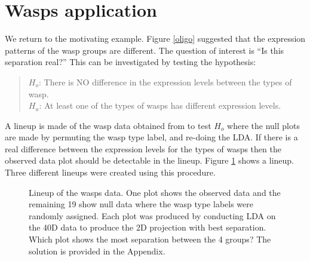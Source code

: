 \section{Wasps application} \label{sec:wasp}

We return to the motivating example. Figure \ref{oligo} suggested that the expression patterns of the wasp groups are different.  The question of interest is ``Is this separation real?'' This can be investigated by testing the hypothesis: 

\begin{quote}
$H_o$: There is NO difference in the expression levels between the types of wasp.\\
$H_a$: At least one of the types of wasps has different expression levels.
\end{quote}
A lineup is made of the wasp data obtained from \cite{toth:2010} to test $H_o$ where the null plots are made by permuting the wasp type label, and re-doing the LDA. If there is a real difference between the expression levels for the types of wasps then the observed data plot should be detectable in the lineup. Figure \ref{toth_lineup} shows a lineup.  Three different lineups were created using this procedure. 

\begin{figure}[hbtp]
   \centering
       \caption{Lineup of the wasps data. One plot shows the observed data and the remaining 19 show null data where the wasp type labels were randomly assigned. Each plot was produced by conducting LDA on the 40D data to produce the 2D projection with best separation. Which plot shows the most separation between the 4 groups? The solution is provided in the Appendix.}
       \label{toth_lineup}
\end{figure} 


